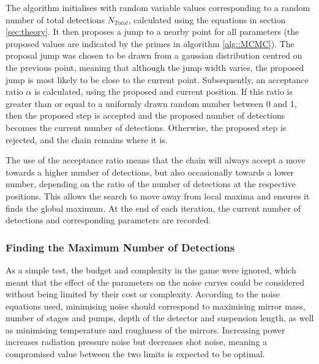 \documentclass{article}
\begin{document}
The algorithm initialises with random variable values corresponding to
a random number of total detections $N_{Total}$, calculated using the
equations in section \ref{sec:theory}. It then proposes a jump to a
nearby point for all parameters (the proposed values are indicated by
the primes in algorithm \ref{alg::MCMC}). The proposal jump was chosen
to be drawn from a gaussian distribution centred on the previous
point, meaning that although the jump width varies, the proposed jump
is most likely to be close to the current point. Subsequently, an
acceptance ratio $\alpha$ is calculated, using the proposed and
current position. If this ratio is greater than or equal to a
uniformly drawn random number between 0 and 1, then the proposed step
is accepted and the proposed number of detections becomes the current
number of detections. Otherwise, the proposed step is rejected, and
the chain remains where it is.

The use of the acceptance ratio means that the chain will always
accept a move towards a higher number of detections, but also
occasionally towards a lower number, depending on the ratio of the
number of detections at the respective positions. This allows the
search to move away from local maxima and ensures it finds the global
maximum. At the end of each iteration, the current number of
detections and corresponding parameters are recorded. 

\subsubsection{Finding the Maximum Number of Detections}
As a simple test, the budget and complexity in the game were ignored,
which meant that the effect of the parameters on the noise curves
could be considered without being limited by their cost or
complexity. According to the noise equations used, minimising noise
should correspond to maximising mirror mass, number of stages and
pumps, depth of the detector and suspension length, as well as
minimising temperature and roughness of the mirrors. Increasing power
increases radiation pressure noise but decreases shot noise, meaning a
compromised value between the two limits is expected to be optimal. 
\end{document}
